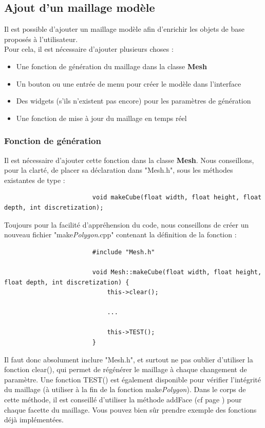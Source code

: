 \documentclass[a4paper]{memoir}
\begin{document}
			\subsection{Ajout d'un maillage modèle}
				Il est possible d'ajouter un maillage modèle afin d'enrichir les objets de base proposés à l'utilisateur.\\
				Pour cela, il est nécessaire d'ajouter plusieurs choses :
				\begin{itemize}
					\item Une fonction de génération du maillage dans la classe \textbf{Mesh}
					\item Un bouton ou une entrée de menu pour créer le modèle dans l'interface
					\item Des widgets (s'ils n'existent pas encore) pour les paramètres de génération
					\item Une fonction de mise à jour du maillage en temps réel
				\end{itemize}
				
				\subsubsection{Fonction de génération}
					Il est nécessaire d'ajouter cette fonction dans la classe \textbf{Mesh}. Nous conseillons, pour la clarté, de placer sa déclaration dans 
					"Mesh.h", sous les méthodes existantes de type :
					\begin{verbatim}
						void makeCube(float width, float height, float depth, int discretization);
					\end{verbatim}
					Toujours pour la facilité d'appréhension du code, nous conseillons de créer un nouveau fichier "make\textit{Polygon}.cpp" contenant la 
					définition de la fonction :
					\begin{verbatim}
						#include "Mesh.h"

						void Mesh::makeCube(float width, float height, float depth, int discretization) {
						    this->clear();
							
						    ...
							
						    this->TEST();
						}
					\end{verbatim}
					Il faut donc absolument inclure "Mesh.h", et surtout ne pas oublier d'utiliser la fonction clear(), qui permet de régénérer le maillage à
					chaque changement de paramètre. Une fonction TEST() est également disponible pour vérifier l'intégrité du maillage (à utiliser à la fin 
					de la fonction make\textit{Polygon}). Dans le corps de cette méthode, il est conseillé d'utiliser la méthode addFace (cf page 
					\pageref{mesh-dev}) pour chaque facette du maillage. Vous pouvez bien sûr prendre exemple des fonctions déjà implémentées.
					
\end{document}
